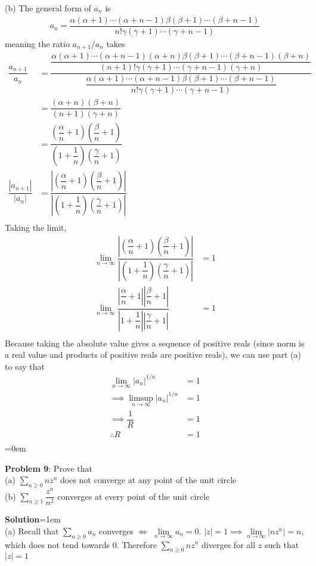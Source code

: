\documentclass{article}
\begin{document}
(b) The general form of $a_n$ is 
\begin{align*}
    a_n = \dfrac{\alpha(\alpha + 1)\cdots(\alpha + n-1)\beta(\beta + 1)\cdots(\beta + n-1)}{n!\gamma(\gamma + 1)\cdots(\gamma + n - 1)}
\end{align*}
meaning the ratio $a_{n+1}/a_n$ takes 
\begin{align*}
    \dfrac{a_{n+1}}{a_n} &= \dfrac{\dfrac{\alpha(\alpha + 1)\cdots(\alpha + n-1)(\alpha+n)\beta(\beta + 1)\cdots(\beta + n-1)(\beta+n)}{(n+1)!\gamma(\gamma + 1)\cdots(\gamma + n - 1)(\gamma+n)}}{\dfrac{\alpha(\alpha + 1)\cdots(\alpha + n-1)\beta(\beta + 1)\cdots(\beta + n-1)}{n!\gamma(\gamma + 1)\cdots(\gamma + n - 1)}}\\
    &= \dfrac{(\alpha+n)(\beta + n)}{(n+1)(\gamma + n)}\\
    &= \dfrac{(\dfrac{\alpha}{n}+1)(\dfrac{\beta}{n} + 1)}{(1+\dfrac{1}{n})(\dfrac{\gamma}{n} + 1)}\\
    \dfrac{|a_{n+1}|}{|a_n|}&= \dfrac{\left|(\dfrac{\alpha}{n}+1)(\dfrac{\beta}{n} + 1)\right|}{\left|(1+\dfrac{1}{n})(\dfrac{\gamma}{n} + 1)\right|}\\
\end{align*}
Taking the limit, 
\begin{align*}
    \lim\limits_{n\to \infty}\dfrac{\left|(\dfrac{\alpha}{n}+1)(\dfrac{\beta}{n} + 1)\right|}{\left|(1+\dfrac{1}{n})(\dfrac{\gamma}{n} + 1)\right|}&= 1\\
    \lim\limits_{n\to \infty}\dfrac{\left|\dfrac{\alpha}{n}+1\right|\left|\dfrac{\beta}{n} + 1\right|}{\left|1+\dfrac{1}{n}\right|\left|\dfrac{\gamma}{n} + 1\right|}&= 1\\
\end{align*}
Because taking the absolute value gives a sequence of positive reals (since norm is a real value and products of positive reals are positive reals), we can use part (a) to say that 
\begin{align*}
    \lim\limits_{n\to \infty} |a_n|^{1/n} &= 1\\
    \implies \limsup\limits_{n\to \infty} |a_n|^{1/n} &= 1\\
    \implies \dfrac{1}{R} &= 1\\
    \therefore R &= 1\\
\end{align*}
\newpage\parskip=0em
\begin{mdframed}[backgroundcolor=blue!20]
\textbf{Problem 9}: Prove that\\
(a) $\sum\limits_{n \geq 0} nz^n$ does not converge at any point of the unit circle\\
(b) $\sum\limits_{n\geq 1}\dfrac{z^n}{n^2}$ converges at every point of the unit circle
\end{mdframed}
\textbf{Solution}\parskip=1em\\
(a) Recall that $\sum\limits_{n\geq 0}a_n$ converges $\iff$ $\lim\limits_{n \to \infty} a_n = 0$. $|z| = 1 \implies \lim\limits_{n\to\infty}|nz^n| = n$, which does not tend towards 0. Therefore $\sum\limits_{n\geq 0}nz^n$ diverges for all $z$ such that $|z| = 1$
\end{document}
